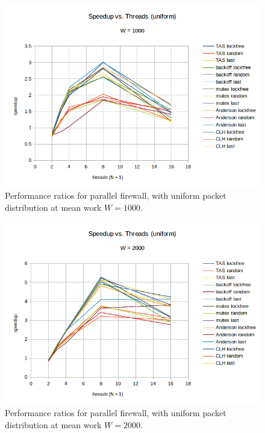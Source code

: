 \documentclass{article}
\begin{document}
\begin{figure}
\begin{center}
	\includegraphics[scale=.8]{packet_2_1000.png}
	\caption{Performance ratios for parallel firewall, with uniform packet distribution at mean work $W = 1000$.}
	\label{packet_2_1000}
\end{center}
\end{figure}

\begin{figure}
\begin{center}
	\includegraphics[scale=.8]{packet_2_2000.png}
	\caption{Performance ratios for parallel firewall, with uniform packet distribution at mean work $W = 2000$.}
	\label{packet_2_2000}
\end{center}
\end{figure}
\end{document}
